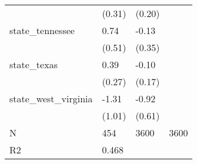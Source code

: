 \begin{table}
\begin{center}
\begin{tabular}{llll}
                                                   & (0.31)                 & (0.20)       &                \\
    state\_tennessee                               & 0.74                   & -0.13        &                \\
                                                   & (0.51)                 & (0.35)       &                \\
    state\_texas                                   & 0.39                   & -0.10        &                \\
                                                   & (0.27)                 & (0.17)       &                \\
    state\_west\_virginia                          & -1.31                  & -0.92        &                \\
                                                   & (1.01)                 & (0.61)       &                \\
    N                                              & 454                    & 3600         & 3600           \\
    R2                                             & 0.468                  &              &                \\
    \hline
    \end{tabular}
    \end{center}
    \end{table}